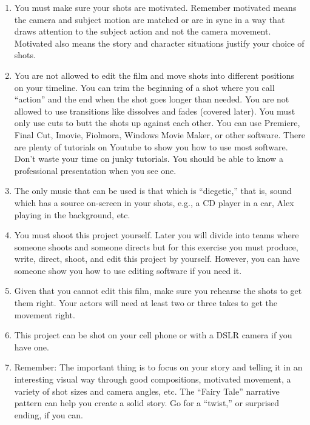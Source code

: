 \documentclass[
]{book}
\providecommand{\tightlist}{%
  \setlength{\itemsep}{0pt}\setlength{\parskip}{0pt}}
\begin{document}
\begin{assessment}
\begin{enumerate}
\def\labelenumi{\arabic{enumi}.}
\setcounter{enumi}{8}
\tightlist
\item
  You must make sure your shots are motivated. Remember motivated means the camera and subject motion are matched or are in sync in a way that draws attention to the subject action and not the camera movement. Motivated also means the story and character situations justify your choice of shots.\\
\item
  You are not allowed to edit the film and move shots into different positions on your timeline. You can trim the beginning of a shot where you call ``action'' and the end when the shot goes longer than needed. You are not allowed to use transitions like dissolves and fades (covered later). You must only use cuts to butt the shots up against each other. You can use Premiere, Final Cut, Imovie, Fiolmora, Windows Movie Maker, or other software. There are plenty of tutorials on Youtube to show you how to use most software. Don't waste your time on junky tutorials. You should be able to know a professional presentation when you see one.\\
\item
  The only music that can be used is that which is ``diegetic,'' that is, sound which has a source on-screen in your shots, e.g., a CD player in a car, Alex playing in the background, etc.\\
\item
  You must shoot this project yourself. Later you will divide into teams where someone shoots and someone directs but for this exercise you must produce, write, direct, shoot, and edit this project by yourself. However, you can have someone show you how to use editing software if you need it.\\
\item
  Given that you cannot edit this film, make sure you rehearse the shots to get them right. Your actors will need at least two or three takes to get the movement right.
\item
  This project can be shot on your cell phone or with a DSLR camera if you have one.\\
\item
  Remember: The important thing is to focus on your story and telling it in an interesting visual way through good compositions, motivated movement, a variety of shot sizes and camera angles, etc. The ``Fairy Tale'' narrative pattern can help you create a solid story. Go for a ``twist,'' or surprised ending, if you can.\\

\end{enumerate}
\end{assessment}
\end{document}
